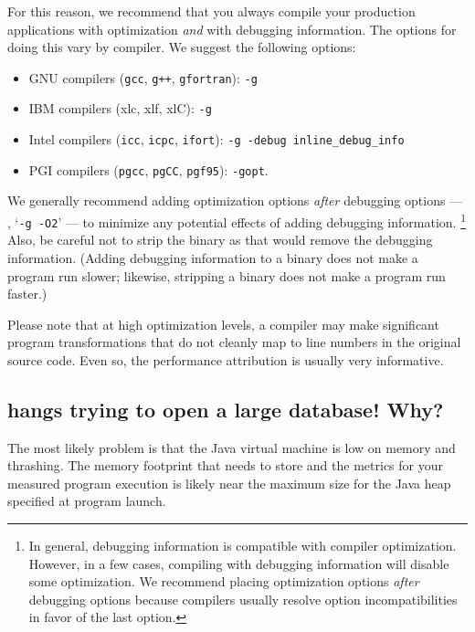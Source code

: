 \documentclass[11pt,twoside,letterpaper]{report}
\begin{document}
For this reason, we recommend that you always compile your production applications with optimization \emph{and} with debugging information.
The options for doing this vary by compiler.
We suggest the following options:
\begin{itemize}
\item GNU compilers (\texttt{gcc}, \texttt{g++}, \texttt{gfortran}): \texttt{-g}
\item IBM compilers (xlc, xlf, xlC): \texttt{-g}
\item Intel compilers (\texttt{icc}, \texttt{icpc}, \texttt{ifort}): \texttt{-g -debug inline\_debug\_info}
\item PGI compilers (\texttt{pgcc}, \texttt{pgCC}, \texttt{pgf95}): \texttt{-gopt}.
\end{itemize}
We generally recommend adding optimization options \emph{after} debugging options --- \eg{}, `\texttt{-g -O2}' --- to minimize any potential effects of adding debugging information.%
\footnote{In general, debugging information is compatible with compiler optimization.
However, in a few cases, compiling with debugging information will disable some optimization.
We recommend placing optimization options \emph{after} debugging options because compilers usually resolve option incompatibilities in favor of the last option.}
Also, be careful not to strip the binary as that would remove the debugging information.
(Adding debugging information to a binary does not make a program run slower; likewise, stripping a binary does not make a program run faster.)

Please note that at high optimization levels, a compiler may make significant program transformations that do not cleanly map to line numbers in the original source code.
Even so, the performance attribution is usually very informative.



\subsection{\hpcviewer{} hangs trying to open a large database! Why?}

The most likely problem is that the Java virtual machine is low on memory and thrashing. The memory footprint that \hpcviewer{} needs to store and the metrics for your measured program execution is likely near the maximum size for the Java heap specified at program launch.
\end{document}
